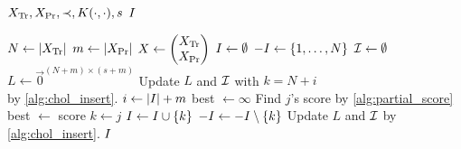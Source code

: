 \begin{algorithmic}[1]
  \REQUIRE \( X_{\text{Tr}}, X_{\text{Pr}}, \prec, K(\cdot, \cdot), s \)
  \ENSURE \( I \)

  \STATE \( N \gets \lvert X_{\text{Tr}}\rvert \)
  \STATE \( m \gets \lvert X_{\text{Pr}}\rvert \)
  \STATE \(
    X \gets
    \begin{pmatrix}
      X_{\text{Tr}} \\
      X_{\text{Pr}}
    \end{pmatrix}
  \)
  \STATE \( I \gets \emptyset \)
  \STATE \( -I \gets \{ 1, \dotsc, N \} \)
  \STATE \( \mathcal{I} \gets \emptyset \)
  \STATE \( L \gets \vec{0}^{(N + m) \times (s + m)} \)
    \STATE Update \( L \) and \( \mathcal{I} \) with
      \( k = N + i \) \\ by \cref{alg:chol_insert}.
  \ENDFOR
    \STATE \( i \gets \lvert I\rvert + m \)
    \STATE best \( \gets \infty \)
      \STATE Find \( j \)'s score by \cref{alg:partial_score}
        \STATE best \( \gets \) score
        \STATE \( k \gets j \)
      \ENDIF
    \ENDFOR
    \STATE \( I \gets I \cup \{ k \} \)
    \STATE \( -I \gets -I \setminus \{ k \} \)
    \STATE Update \( L \) and \( \mathcal{I} \) by \cref{alg:chol_insert}.
  \ENDWHILE
  \RETURN \( I \)
\end{algorithmic}
